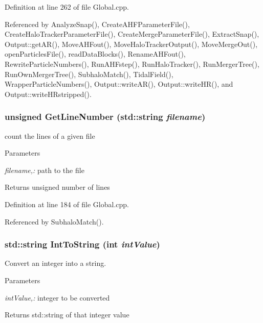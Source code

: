 Definition at line 262 of file Global.cpp.



Referenced by AnalyzeSnap(), CreateAHFParameterFile(), CreateHaloTrackerParameterFile(), CreateMergeParameterFile(), ExtractSnap(), Output::getAR(), MoveAHFout(), MoveHaloTrackerOutput(), MoveMergeOut(), openParticlesFile(), readDataBlocks(), RenameAHFout(), RewriteParticleNumbers(), RunAHFstep(), RunHaloTracker(), RunMergerTree(), RunOwnMergerTree(), SubhaloMatch(), TidalField(), WrapperParticleNumbers(), Output::writeAR(), Output::writeHR(), and Output::writeHRstripped().

\subsubsection[{GetLineNumber}]{\setlength{\rightskip}{0pt plus 5cm}unsigned GetLineNumber (std::string {\em filename})}\label{Global_8h_a5cf7528ff238e0f7be1d86289650f04e}
count the lines of a given file 
\begin{DoxyParams}{Parameters}
\item[{\em filename,:}]path to the file \end{DoxyParams}
\begin{DoxyReturn}{Returns}
unsigned number of lines 
\end{DoxyReturn}


Definition at line 184 of file Global.cpp.



Referenced by SubhaloMatch().

\subsubsection[{IntToString}]{\setlength{\rightskip}{0pt plus 5cm}std::string IntToString (int {\em intValue})}\label{Global_8h_a3d2b4d4a9d8d164a3fdea80bfc1ea93d}
Convert an integer into a string. 
\begin{DoxyParams}{Parameters}
\item[{\em intValue,:}]integer to be converted \end{DoxyParams}
\begin{DoxyReturn}{Returns}
std::string of that integer value 
\end{DoxyReturn}


